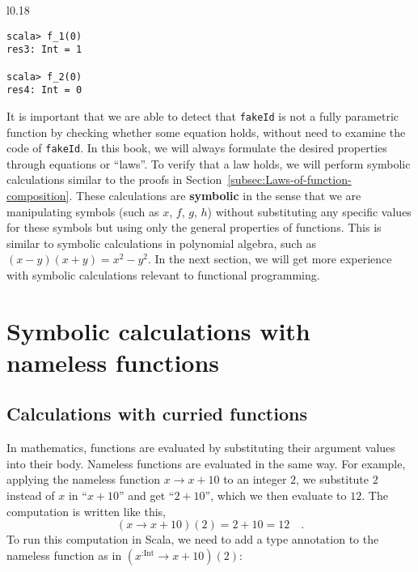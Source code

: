 \begin{wrapfigure}{l}{0.18\columnwidth}%
\vspace{-0.8\baselineskip}
\begin{lstlisting}
scala> f_1(0)
res3: Int = 1

scala> f_2(0)
res4: Int = 0
\end{lstlisting}

\vspace{-0.8\baselineskip}
\end{wrapfigure}%

\noindent It is important that we are able to detect that \lstinline!fakeId!
is not a fully parametric function by checking whether some equation
holds, without need to examine the code of \lstinline!fakeId!. In
this book, we will always formulate the desired properties through
equations or \textsf{``}laws\textsf{''}. To verify that a law holds, we will perform
symbolic calculations similar to the
proofs in Section~\ref{subsec:Laws-of-function-composition}. These
calculations are \textbf{symbolic} in the sense that we are manipulating
symbols (such as $x$, $f$, $g$, $h$) without substituting any
specific values for these symbols but using only the general properties
of functions. This is similar to symbolic calculations in polynomial
algebra, such as $\left(x-y\right)\left(x+y\right)=x^{2}-y^{2}$.
In the next section, we will get more experience with symbolic calculations
relevant to functional programming.

\section{Symbolic calculations with nameless functions}

\subsection{Calculations with curried functions}

In mathematics, functions are evaluated by substituting their argument
values into their body. Nameless functions are evaluated in the same
way. For example, applying the nameless function $x\rightarrow x+10$
to an integer $2$, we substitute $2$ instead of $x$ in \textquotedblleft $x+10$\textquotedblright{}
and get \textquotedblleft $2+10$\textquotedblright , which we then
evaluate to $12$. The computation is written like this, 
\[
(x\rightarrow x+10)(2)=2+10=12\quad.
\]
To run this computation in Scala, we need to add a type annotation
to the nameless function as in $(x^{:\text{Int}}\rightarrow x+10)(2)$:


